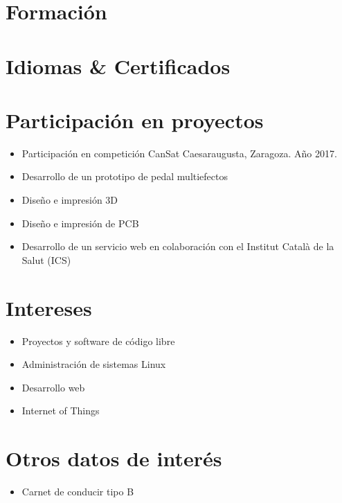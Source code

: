 \documentclass{greatcv}
\begin{document}
\section*{Formación}


\section*{Idiomas \& Certificados}


\section*{Participación en proyectos}

\begin{itemize}
    \item Participación en competición CanSat Caesaraugusta, Zaragoza. Año 2017.
    \item Desarrollo de un prototipo de pedal multiefectos
    \item Diseño e impresión 3D
    \item Diseño e impresión de PCB
    \item Desarrollo de un servicio web en colaboración con el Institut Català de la Salut (ICS)
\end{itemize}

\section*{Intereses}

\begin{itemize}
    \item Proyectos y software de código libre
    \item Administración de sistemas Linux
    \item Desarrollo web
    \item Internet of Things
\end{itemize}

\section*{Otros datos de interés}

\begin{itemize}
    \item Carnet de conducir tipo B
\end{itemize}
\end{document}
